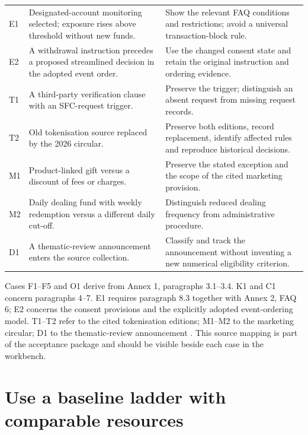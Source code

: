 \begin{longtable}{P{0.09\textwidth}P{0.41\textwidth}P{0.4\textwidth}}
E1 & Designated-account monitoring selected; exposure rises above threshold without
new funds. & Show the relevant FAQ conditions and restrictions; avoid a universal
transaction-block rule.\\
E2 & A withdrawal instruction precedes a proposed streamlined decision in the
adopted event order. & Use the changed consent state and retain the original
instruction and ordering evidence.\\
T1 & A third-party verification clause with an SFC-request trigger. & Preserve the
trigger; distinguish an absent request from missing request records.\\
T2 & Old tokenisation source replaced by the 2026 circular. & Preserve both editions,
record replacement, identify affected rules and reproduce historical decisions.\\
M1 & Product-linked gift versus a discount of fees or charges. & Preserve the stated
exception and the scope of the cited marketing provision.\\
M2 & Daily dealing fund with weekly redemption versus a different daily cut-off. &
Distinguish reduced dealing frequency from administrative procedure.\\
D1 & A thematic-review announcement enters the source collection. & Classify and
track the announcement without inventing a new numerical eligibility criterion.\\
\bottomrule
\end{longtable}
\endgroup


Cases F1--F5 and O1 derive from Annex 1, paragraphs 3.1--3.4. K1 and C1 concern
paragraphs 4--7. E1 requires paragraph 8.3 together with Annex 2, FAQ 6; E2 concerns
the consent provisions and the explicitly adopted event-ordering model. T1--T2
refer to the cited tokenisation editions; M1--M2 to the marketing circular; D1
to the thematic-review announcement
\citep{sfcspiannex1,sfcspiannex2,sfctoken2023,sfctoken2026,sfcmarketing,sfcreview2025}.
This source mapping is part of the acceptance package and should be visible
beside each case in the workbench.

\section{Use a baseline ladder with comparable resources}
\label{merge:M09:04}


